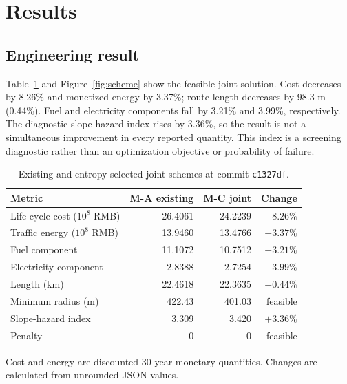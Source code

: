 \documentclass[preprint,12pt]{elsarticle}
\begin{document}
\section{Results}

\subsection{Engineering result}

Table~\ref{tab:main} and Figure~\ref{fig:scheme} show the feasible joint solution. Cost decreases by 8.26\% and monetized energy by 3.37\%; route length decreases by 98.3 m (0.44\%). Fuel and electricity components fall by 3.21\% and 3.99\%, respectively. The diagnostic slope-hazard index rises by 3.36\%, so the result is not a simultaneous improvement in every reported quantity. This index is a screening diagnostic rather than an optimization objective or probability of failure.

\begin{table}[t]
\centering
\caption{Existing and entropy-selected joint schemes at commit \texttt{c1327df}.}
\label{tab:main}
\begin{threeparttable}
\begin{tabular}{lrrr}
\toprule
Metric & M-A existing & M-C joint & Change \\
\midrule
Life-cycle cost ($10^8$ RMB) & 26.4061 & 24.2239 & $-8.26\%$ \\
Traffic energy ($10^8$ RMB) & 13.9460 & 13.4766 & $-3.37\%$ \\
\quad Fuel component & 11.1072 & 10.7512 & $-3.21\%$ \\
\quad Electricity component & 2.8388 & 2.7254 & $-3.99\%$ \\
Length (km) & 22.4618 & 22.3635 & $-0.44\%$ \\
Minimum radius (m) & 422.43 & 401.03 & feasible \\
Slope-hazard index & 3.309 & 3.420 & $+3.36\%$ \\
Penalty & 0 & 0 & feasible \\
\bottomrule
\end{tabular}
\begin{tablenotes}\footnotesize
\item Cost and energy are discounted 30-year monetary quantities. Changes are calculated from unrounded JSON values.
\end{tablenotes}
\end{threeparttable}
\end{table}
\end{document}
